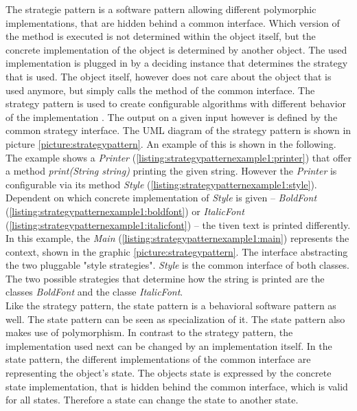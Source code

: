 The strategie pattern is a software pattern allowing different polymorphic implementations, that are hidden behind a common interface. Which version of the method is executed is not determined within the object itself, but the concrete implementation of the object is determined by another object. The used implementation is plugged in by a deciding instance that determines the strategy that is used. The object itself, however does not care about the object that is used anymore, but simply calls the method of the common interface. The strategy pattern is used to create configurable algorithms with different behavior of the implementation \cite[p. 349]{gof}. The output on a given input however is defined by the common strategy interface. The \ac{UML} diagram of the strategy pattern is shown in picture \ref{picture:strategypattern}. An example of this is shown in the following.
\\

The example shows a \textit{Printer} (\ref{listing:strategypatternexample1:printer}) that offer a method \textit{print(String string)} printing the given string. However the \textit{Printer} is configurable via its method \textit{Style} (\ref{listing:strategypatternexample1:style}). Dependent on which concrete implementation of \textit{Style} is given -- \textit{BoldFont} (\ref{listing:strategypatternexample1:boldfont}) or \textit{ItalicFont} (\ref{listing:strategypatternexample1:italicfont}) -- the tiven text is printed differently. In this example, the \textit{Main} (\ref{listing:strategypatternexample1:main}) represents the context, shown in the graphic \ref{picture:strategypattern}. The interface abstracting the two pluggable "style strategies". \textit{Style} is the common interface of both classes. The two possible strategies that determine how the string is printed are the classes \textit{BoldFont} and the classe \textit{ItalicFont}.
\\

Like the strategy pattern, the state pattern is a behavioral software pattern as well. The state pattern can be seen as specialization of it. The state pattern also makes use of polymorphism. In contrast to the strategy pattern, the implementation used next can be changed by an implementation itself. In the state pattern, the different implementations of the common interface are representing the object's state. The objects state is expressed by the concrete state implementation, that is hidden behind the common interface, which is valid for all states. Therefore a state can change the state to another state.
\\

